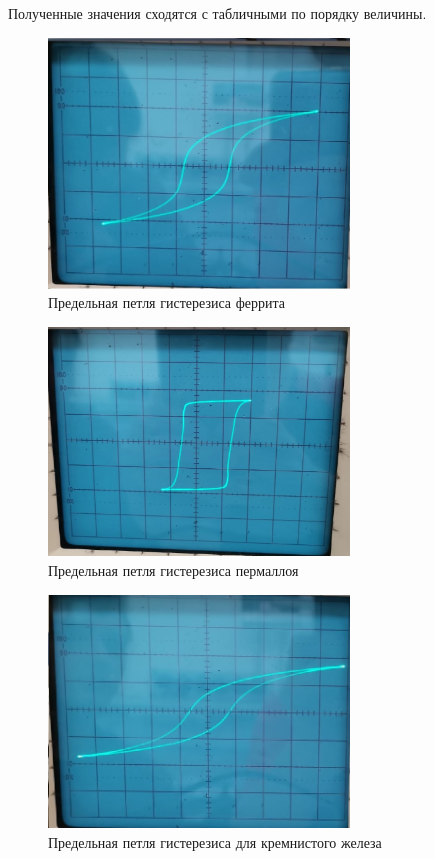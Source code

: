 \begin{enumerate}
Полученные значения сходятся с табличными по порядку величины.
\begin{figure}[h!]
    \centering
    \includegraphics[width=8cm]{ferrit.jpg}
    \caption{Предельная петля гистерезиса феррита}
\end{figure}
\begin{figure}[h!]
    \centering
    \includegraphics[width=8cm]{permalloi.jpg}
    \caption{Предельная петля гистерезиса пермаллоя}
\end{figure}
\newpage
\begin{figure}[h!]
    \centering
    \includegraphics[width=8cm]{Si_Fe.jpg}
    \caption{Предельная петля гистерезиса для кремнистого железа}
\end{figure}


\end{enumerate}
